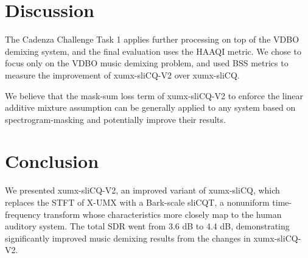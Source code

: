 \documentclass{INTERSPEECH2023}
\begin{document}
\section{Discussion}

The Cadenza Challenge Task 1 applies further processing on top of the VDBO demixing system, and the final evaluation uses the HAAQI metric. We chose to focus only on the VDBO music demixing problem, and used BSS metrics to measure the improvement of xumx-sliCQ-V2 over xumx-sliCQ.

We believe that the mask-sum loss term of xumx-sliCQ-V2 to enforce the linear additive mixture assumption can be generally applied to any system based on spectrogram-masking and potentially improve their results.

\section{Conclusion}

We presented xumx-sliCQ-V2, an improved variant of xumx-sliCQ, which replaces the STFT of X-UMX with a Bark-scale sliCQT, a nonuniform time-frequency transform whose characteristics more closely map to the human auditory system. The total SDR went from 3.6 dB to 4.4 dB, demonstrating significantly improved music demixing results from the changes in xumx-sliCQ-V2.



\end{document}
